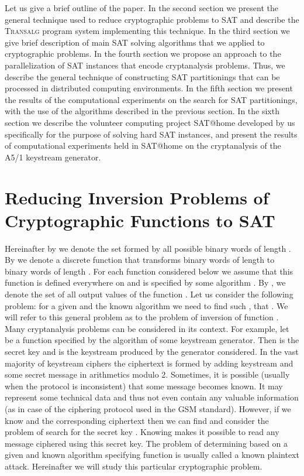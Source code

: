 \documentclass[runningheads,a4paper]{llncs}
\begin{document}
Let us give a brief outline of the paper. In the second section we present the general technique used to reduce cryptographic problems to SAT and describe the \textsc{Transalg} program system implementing this technique. In the third section we give brief description of main SAT solving algorithms that we applied to cryptographic problems. In the fourth section we propose an approach to the parallelization of SAT instances that encode cryptanalysis problems. Thus, we describe the general technique of constructing SAT partitionings that can be processed in distributed computing environments. In the fifth section we present the results of the computational experiments on the search for SAT partitionings, with the use of the algorithms described in the previous section. In the sixth section we describe the volunteer computing project SAT@home developed by us specifically for the purpose of solving hard SAT instances, and present the results of computational experiments held in SAT@home on the cryptanalysis of the A5/1 keystream generator.

\section{Reducing Inversion Problems of Cryptographic Functions to SAT}

Hereinafter by  we denote the set formed by all possible binary words of length . By  we denote a discrete function that transforms binary words of length  to binary words of length . For each function considered below we assume that this function is defined everywhere on  and is specified by some algorithm . By ,  we denote the set of all output values of the function . Let us consider the following problem: for a given  and the known algorithm  we need to find such , that . We will refer to this general problem as to the problem of inversion of function . Many cryptanalysis problems can be considered in its context. For example, let  be a function specified by the algorithm of some keystream generator. Then  is the secret key and  is the keystream produced by the generator considered. In the vast majority of keystream ciphers the ciphertext is formed by adding keystream and some secret message  in arithmetics modulo 2. Sometimes, it is possible (usually when the protocol is inconsistent) that some message  becomes known. It may represent some technical data and thus not even contain any valuable information (as in case of the ciphering protocol used in the GSM standard). However, if we know  and the corresponding ciphertext then we can find  and consider the problem of search for the secret key . Knowing  makes it possible to read any message ciphered using this secret key. The problem of determining  based on a given  and known algorithm specifying function  is usually called a known plaintext attack. Hereinafter we will study this particular cryptographic problem.
\end{document}
